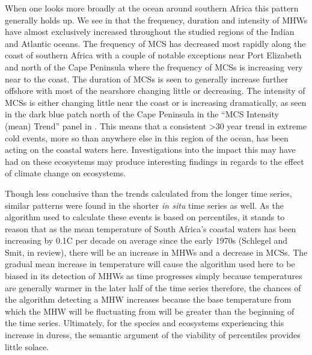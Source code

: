 \documentclass[a4paper,10pt,review]{elsarticle}
\begin{document}
When one looks more broadly at the ocean around southern Africa this pattern generally holds up. We see in  that the frequency, duration and intensity of MHWs have almost exclusively increased throughout the studied regions of the Indian and Atlantic oceans. The frequency of MCS has decreased most rapidly along the coast of southern Africa with a couple of notable exceptions near Port Elizabeth and north of the Cape Peninsula where the frequency of MCSs is increasing very near to the coast. The duration of MCSs is seen to generally increase further offshore with most of the nearshore changing little or decreasing. The intensity of MCSs is either changing little near the coast or is increasing dramatically, as seen in the dark blue patch north of the Cape Peninsula in the ``MCS Intensity (mean) Trend'' panel in . This means that a consistent >30 year trend in extreme cold events, more so than anywhere else in this region of the ocean, has been acting on the coastal waters here. Investigations into the impact this may have had on these ecosystems may produce interesting findings in regards to the effect of climate change on ecosystems.

Though less conclusive than the trends calculated from the longer time series, similar patterns were found in the shorter \emph{in situ} time series as well. As the algorithm used to calculate these events is based on percentiles, it stands to reason that as the mean temperature of South Africa's coastal waters has been increasing by 0.1\degree C per decade on average since the early 1970s (Schlegel and Smit, in review), there will be an increase in MHWs and a decrease in MCSs. The gradual mean increase in temperature will cause the algorithm used here to be biased in its detection of MHWs as time progresses simply because temperatures are generally warmer in the later half of the time series therefore, the chances of the algorithm detecting a MHW increases because the base temperature from which the MHW will be fluctuating from will be greater than the beginning of the time series. Ultimately, for the species and ecosystems experiencing this increase in duress, the semantic argument of the viability of percentiles provides little solace.
\end{document}
